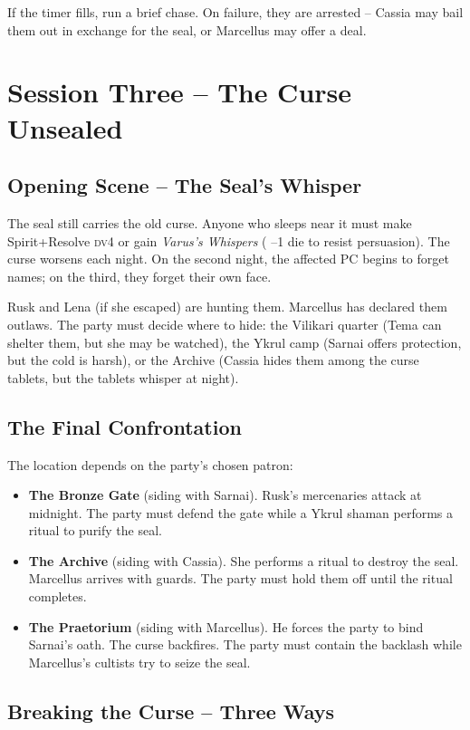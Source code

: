 \documentclass[10pt,twoside]{book}
\newcommand{\dv}{\textsc{dv}}
\begin{document}
If the timer fills, run a brief chase. On failure, they are arrested -- Cassia may bail them out in exchange for the seal, or Marcellus may offer a deal.

\chapter{Session Three -- The Curse Unsealed}

\section{Opening Scene -- The Seal's Whisper}

The seal still carries the old curse. Anyone who sleeps near it must make Spirit+Resolve \dv 4 or gain \textit{Varus's Whispers} ( --1 die to resist persuasion). The curse worsens each night. On the second night, the affected PC begins to forget names; on the third, they forget their own face.

Rusk and Lena (if she escaped) are hunting them. Marcellus has declared them outlaws. The party must decide where to hide: the Vilikari quarter (Tema can shelter them, but she may be watched), the Ykrul camp (Sarnai offers protection, but the cold is harsh), or the Archive (Cassia hides them among the curse tablets, but the tablets whisper at night).

\section{The Final Confrontation}

The location depends on the party's chosen patron:

\begin{itemize}
\item \textbf{The Bronze Gate} (siding with Sarnai). Rusk's mercenaries attack at midnight. The party must defend the gate while a Ykrul shaman performs a ritual to purify the seal.
\item \textbf{The Archive} (siding with Cassia). She performs a ritual to destroy the seal. Marcellus arrives with guards. The party must hold them off until the ritual completes.
\item \textbf{The Praetorium} (siding with Marcellus). He forces the party to bind Sarnai's oath. The curse backfires. The party must contain the backlash while Marcellus's cultists try to seize the seal.
\end{itemize}

\section{Breaking the Curse -- Three Ways}
\end{document}
